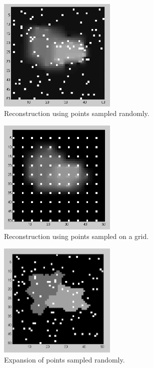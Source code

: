 \documentclass[english]{article}\usepackage[]{graphicx}\usepackage[]{color}
\begin{document}
\begin{figure}[h!]
  \centering
    \includegraphics[width=0.5\textwidth]{figures/randompointreconstruction}
  \caption{Reconstruction using points sampled randomly.}
  \label{fig:randrec}
\end{figure}
\begin{figure}[h!]
  \centering
    \includegraphics[width=0.5\textwidth]{figures/gridpointreconstruction}
  \caption{Reconstruction using points sampled on a grid.}
  \label{fig:gridrec}
\end{figure}
\begin{figure}[h!]
  \centering
    \includegraphics[width=0.5\textwidth]{figures/randompointexpansion}
  \caption{Expansion of points sampled randomly.}
  \label{fig:randexp}
\end{figure}
\end{document}
